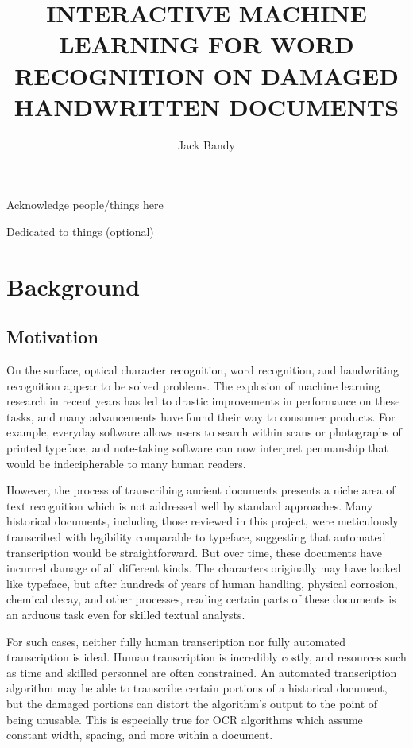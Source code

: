 \documentclass[final]{ukthesis}
\begin{document}
\author{Jack Bandy}
\title{INTERACTIVE MACHINE LEARNING FOR WORD RECOGNITION ON DAMAGED HANDWRITTEN DOCUMENTS}
\frontmatter
\maketitle
\begin{acknowledgments}
Acknowledge people/things here
\end{acknowledgments}
\begin{dedication}
Dedicated to things (optional)
\end{dedication}
\tableofcontents\clearpage
\listoffigures\clearpage
\listoftables\clearpage
\mainmatter
\chapter{Background}
\section{Motivation}
On the surface, optical character recognition, word recognition, and handwriting recognition appear to be solved problems. The explosion of machine learning research in recent years has led to drastic improvements in performance on these tasks, and many advancements have found their way to consumer products. For example, everyday software allows users to search within scans or photographs of printed typeface, and note-taking software can now interpret penmanship that would be indecipherable to many human readers.

However, the process of transcribing ancient documents presents a niche area of text recognition which is not addressed well by standard approaches. Many historical documents, including those reviewed in this project, were meticulously transcribed with legibility comparable to typeface, suggesting that automated transcription would be straightforward. But over time, these documents have incurred damage of all different kinds. The characters originally may have looked like typeface, but after hundreds of years of human handling, physical corrosion, chemical decay, and other processes, reading certain parts of these documents is an arduous task even for  skilled textual analysts.

For such cases, neither fully human transcription nor fully automated transcription is ideal. Human transcription is incredibly costly, and resources such as time and skilled personnel are often constrained. An automated transcription algorithm may be able to transcribe certain portions of a historical document, but the damaged portions can distort the algorithm's output to the point of being unusable. This is especially true for OCR algorithms which assume constant width, spacing, and more within a document.
\end{document}
